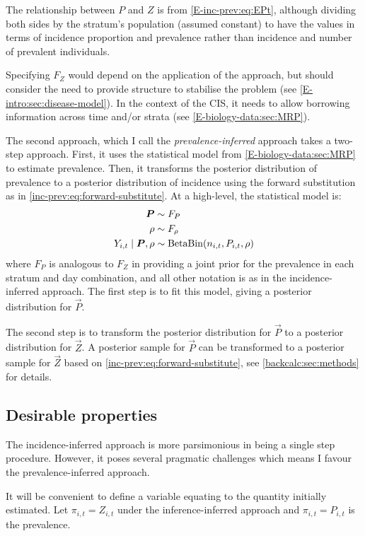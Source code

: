 \documentclass[thesis.tex]{subfiles}
\begin{document}
The relationship between $P$ and $Z$ is from \cref{E-inc-prev:eq:EPt}, although dividing both sides by the stratum's population (assumed constant) to have the values in terms of incidence proportion and prevalence rather than incidence and number of prevalent individuals.

Specifying $F_Z$ would depend on the application of the approach, but should consider the need to provide structure to stabilise the problem (see \cref{E-intro:sec:disease-model}).
In the context of the CIS, it needs to allow borrowing information across time and/or strata (see \cref{E-biology-data:sec:MRP}).

The second approach, which I call the \emph{prevalence-inferred} approach takes a two-step approach.
First, it uses the statistical model from \cref{E-biology-data:sec:MRP} to estimate prevalence.
Then, it transforms the posterior distribution of prevalence to a posterior distribution of incidence using the forward substitution as in \cref{inc-prev:eq:forward-substitute}.
At a high-level, the statistical model is:
\begin{align}
    \bm{P}  &\sim F_P \\
    \rho &\sim F_\rho \\
    Y_{i,t} \mid \bm{P}, \rho &\sim \operatorname{BetaBin}(n_{i,t}, P_{i,t}, \rho)
\end{align}
where $F_P$ is analogous to $F_Z$ in providing a joint prior for the prevalence in each stratum and day combination, and all other notation is as in the incidence-inferred approach.
The first step is to fit this model, giving a posterior distribution for $\vec{P}$.

The second step is to transform the posterior distribution for $\vec{P}$ to a posterior distribution for $\vec{Z}$.
A posterior sample for $\vec{P}$ can be transformed to a posterior sample for $\vec{Z}$ based on \cref{inc-prev:eq:forward-substitute}, see \cref{backcalc:sec:methods} for details.

\subsection{Desirable properties}

The incidence-inferred approach is more parsimonious in being a single step procedure.
However, it poses several pragmatic challenges which means I favour the prevalence-inferred approach.

It will be convenient to define a variable equating to the quantity initially estimated.
Let $\pi_{i,t} = Z_{i,t}$ under the inference-inferred approach and $\pi_{i,t} = P_{i,t}$ is the prevalence.
\end{document}
